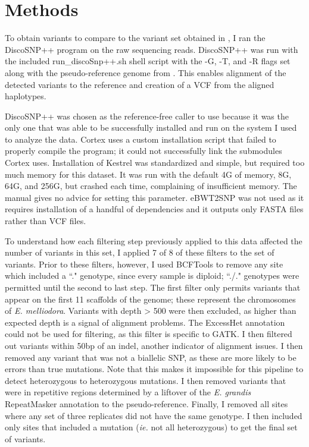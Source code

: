 \section{Methods}

To obtain variants to compare to the variant set obtained in \cite{orr_phylogenomic_2020}, I ran the DiscoSNP++ program on the raw sequencing reads. DiscoSNP++ was run with the included run\_discoSnp++.sh shell script with the -G, -T, and -R flags set along with the pseudo-reference genome from \cite{orr_phylogenomic_2020}. This enables alignment of the detected variants to the reference and creation of a VCF from the aligned haplotypes.

DiscoSNP++ was chosen as the reference-free caller to use because it was the only one that was able to be successfully installed and run on the system I used to analyze the data. Cortex \parencite{iqbal_novo_2012} uses a custom installation script that failed to properly compile the program; it could not successfully link the submodules Cortex uses. Installation of Kestrel \parencite{audano_mapping-free_2018} was standardized and simple, but required too much memory for this dataset. It was run with the default 4G of memory, 8G, 64G, and 256G, but crashed each time, complaining of insufficient memory. The manual gives no advice for setting this parameter. eBWT2SNP \parencite{prezza_snps_2019} was not used as it requires installation of a handful of dependencies and it outputs only FASTA files rather than VCF files.

To understand how each filtering step previously applied to this data affected the number of variants in this set, I applied 7 of 8 of these filters to the set of variants. Prior to these filters, however, I used BCFTools \parencite{li_statistical_2011} to remove any site which included a ``." genotype, since every sample is diploid; ``./." genotypes were permitted until the second to last step. The first filter only permits variants that appear on the first 11 scaffolds of the genome; these represent the chromosomes of \textit{E. melliodora}. Variants with depth > 500 were then excluded, as higher than expected depth is a signal of alignment problems. The ExcessHet annotation could not be used for filtering, as this filter is specific to GATK. I then filtered out variants within 50bp of an indel, another indicator of alignment issues. I then removed any variant that was not a biallelic SNP, as these are more likely to be errors than true mutations. Note that this makes it impossible for this pipeline to detect heterozygous to heterozygous mutations. I then removed variants that were in repetitive regions determined by a liftover of the \textit{E. grandis} RepeatMasker annotation \parencite{bartholome_high-resolution_2015} to the pseudo-reference. Finally, I removed all sites where any set of three replicates did not have the same genotype. I then included only sites that included a mutation (\textit{ie.} not all heterozygous) to get the final set of variants.

